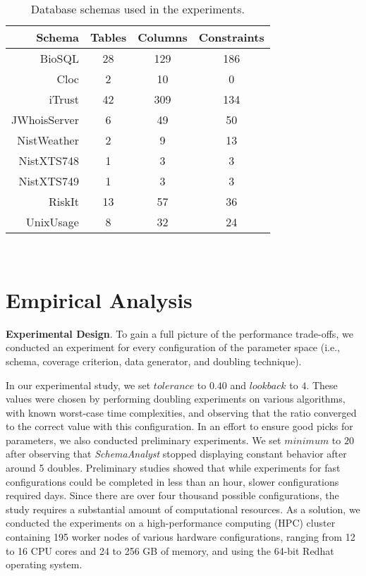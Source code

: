 
\begin{table}[t]
  \centering

  \begin{tabular}{r | c c c}
                           Schema & Tables & Columns & Constraints \\ \hline
    BioSQL                        & 28     & 129     & 186 \\
    Cloc                          & 2      & 10      & 0 \\
    iTrust                        & 42     & 309     & 134 \\
    JWhoisServer                  & 6      & 49      & 50 \\
    NistWeather                   & 2      & 9       & 13 \\
    NistXTS748                    & 1      & 3       & 3 \\
    NistXTS749                    & 1      & 3       & 3 \\
    RiskIt                        & 13     & 57      & 36 \\
    UnixUsage                     & 8      & 32      & 24
  \end{tabular}

  \caption{Database schemas used in the experiments.}~\label{tab:schemas}
\end{table}

\vspace{-.05in}
\section{Empirical Analysis}
\vspace{-.05in}

\textbf{Experimental Design}. To gain a full picture of the performance trade-offs, we conducted an experiment for every
configuration of the parameter space (i.e., schema, coverage criterion, data generator, and doubling technique).

In our experimental study, we set $\mathit{tolerance}$ to $0.40$ and $\mathit{lookback}$ to $4$. These values were
chosen by performing doubling experiments on various algorithms, with known worst-case time complexities, and observing
that the ratio converged to the correct value with this configuration.  In an effort to ensure good picks for
parameters, we also conducted preliminary experiments. We set $\mathit{minimum}$ to $20$ after observing that
\textit{SchemaAnalyst} stopped displaying constant behavior after around 5 doubles.  Preliminary studies showed that
while experiments for fast configurations could be completed in less than an hour, slower configurations required days.
Since there are over four thousand possible configurations, the study requires a substantial amount of computational
resources.  As a solution, we conducted the experiments on a high-performance computing (HPC) cluster containing 195
worker nodes of various hardware configurations, ranging from 12 to 16 CPU cores and 24 to 256 GB of memory, and using
the 64-bit Redhat operating system.



